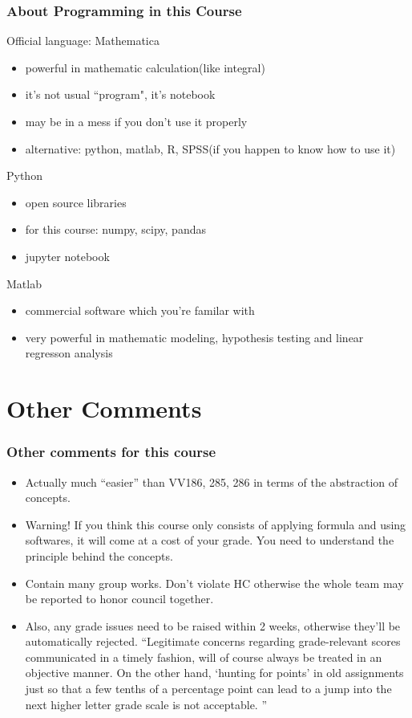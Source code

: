 \documentclass{beamer}
\begin{document}
\begin{frame} 

\frametitle{About Programming in this Course}
Official language: Mathematica
\begin{itemize}
    \item powerful in mathematic calculation(like integral)
    \item it's not usual ``program", it's notebook
    \item may be in a mess if you don't use it properly
    \item alternative: python, matlab, R, SPSS(if you happen to know how to use it)
\end{itemize}
Python
\begin{itemize}
    \item open source libraries
    \item for this course: numpy, scipy, pandas
    \item jupyter notebook
\end{itemize}
Matlab
\begin{itemize}
    \item commercial software which you're familar with
    \item very powerful in mathematic modeling, hypothesis testing and linear regresson analysis
\end{itemize}

\end{frame}

\section{Other Comments}
\begin{frame}
    \frametitle{Other comments for this course}
    \begin{itemize}
        \item Actually much ``easier'' than VV186, 285, 286 in terms of the abstraction of concepts.
        \item Warning! If you think this course only consists of applying formula and using softwares, it will come at a cost of your grade. You need to understand the principle behind the concepts.
        \item Contain many group works. Don't violate HC otherwise the whole team may be reported to honor council together. 
        \item Also, any grade issues need to be raised within 2 weeks, otherwise they'll be automatically rejected. ``Legitimate concerns regarding grade-relevant scores communicated in a timely fashion, will of course always be treated in an objective manner. On the other hand, `hunting for points' in old assignments just so that a few tenths of a percentage point can lead to a jump into the next higher letter grade scale is not acceptable. ''
    \end{itemize}
    
\end{frame}
\end{document}

